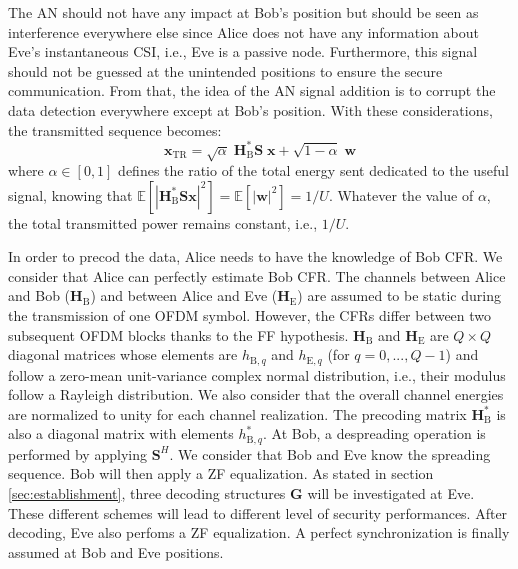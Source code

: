 \documentclass[journal,comsoc]{IEEEtran}
\newcommand{\module}[1]{\left|#1\right|}
\newcommand{\EX}[1]{\mathbb{E} \left[#1\right]}%
\newcommand{\HE}{\textbf{H}_{\text{E}}}
\newcommand{\HB}{\textbf{H}_{\text{B}}}
\newcommand{\spread}{\textbf{S}}
\newcommand{\w}{\textbf{w}}
\begin{document}
The AN should not have any impact at Bob's position but should be seen as interference everywhere else since Alice does not have any information about Eve's instantaneous CSI, i.e., Eve is a passive node. Furthermore, this signal should not be guessed at the unintended positions to ensure the secure communication. From that, the idea of the AN signal addition is to corrupt the data detection everywhere except at Bob's position. With these considerations, the transmitted sequence becomes:
\begin{equation}
\textbf{x}_{\text{TR}} = \sqrt{\alpha} \;\HB^*  \spread\; \textbf{x} +  \sqrt{1-\alpha} \; \w
\label{eq:sym_rad_AN}
\end{equation} 
where $\alpha \in [0,1]$ defines the ratio of the total energy sent dedicated to the useful signal, knowing that $\EX{\module{\HB^*\spread\textbf{x}}^2} = \EX{\module{\w}^2} = 1/U$. Whatever the value of $\alpha$, the total transmitted power remains constant, i.e., $1/U$.

In order to precod the data, Alice needs to have the knowledge of Bob CFR. We consider that Alice can perfectly estimate Bob CFR. The channels between Alice and Bob ($\HB$) and between Alice and Eve ($\HE$) are assumed to be static during the transmission of one OFDM symbol. However, the CFRs differ between two subsequent OFDM blocks thanks to the FF hypothesis. $\HB$ and $\HE$ are $Q\times Q$ diagonal matrices whose elements are $h_{\text{B},q}$ and $h_{\text{E},q}$ (for $q = 0,...,Q-1$) and follow a zero-mean unit-variance complex normal distribution, i.e., their modulus follow a Rayleigh distribution. We also consider that the overall channel energies are normalized to unity for each channel realization. The precoding matrix $\HB^*$ is also a diagonal matrix with elements $h_{\text{B},q}^*$. At Bob, a despreading operation is performed by applying $\spread^H$. We consider that Bob and Eve know the spreading sequence. Bob will then apply a ZF equalization.  As stated in section \ref{sec:establishment}, three decoding structures $\textbf{G}$ will be investigated at Eve. These different schemes will lead to different level of security performances. After decoding, Eve also perfoms a ZF equalization. A perfect synchronization is finally assumed at Bob and Eve positions.\\







%
\end{document}

